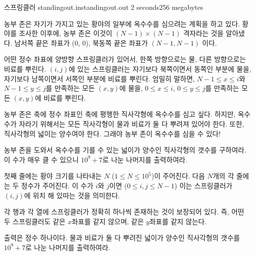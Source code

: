\begin{problem}{스프링클러}
	{standingout.in}{standingout.out}
	{2 seconds}{256 megabytes}{}
	
	농부 존은 자기가 가지고 있는 황야의 일부에 옥수수를 심으려는 계획을 하고 있다. 황야를 조사한 이후에, 농부 존은 이것이 $(N-1) \times (N-1)$ 격자라는 것을 알아냈다. 남서쪽 끝은 좌표가 (0, 0), 북동쪽 끝은 좌표가 $(N-1, N-1)$ 이다.
	
	어떤 정수 좌표에 양방향 스프링클러가 있어서, 한쪽 방향으로는 물, 다른 방향으로는 비료를 뿌린다. $(i, j)$에 있는 스프링클러는 자기보다 북쪽이면서 동쪽인 부분에 물을, 자기보다 남쪽이면서 서쪽인 부분에 비료를 뿌린다. 엄밀히 말하면, $N-1 \le x \le i$와 $N-1 \le y \le j$를 만족하는 모든 $(x, y)$에 물을, $0 \le x \le i$, $0 \le y \le j$를 만족하는 모든 $(x, y)$에 비료를 뿌린다.
	
	
	농부 존은 축에 정수 좌표인 축에 평행한 직사각형에 옥수수를 심고 싶다. 하지만, 옥수수가 자라기 위해서는 모든 직사각형이 물과 비료가 둘 다 뿌려져 있어야 한다. 또한, 직사각형의 넓이는 양수여야 한다. 그래야 농부 존이 옥수수를 심을 수 있다!
	
	농부 존을 도와서 옥수수를 기를 수 있는 넓이가 양수인 직사각형의 갯수를 구하여라. 이 수가 매우 클 수 있으니 $10^9 + 7$로 나눈 나머지를 출력하여라.
	
	
	\InputFile
	
	첫째 줄에는 황야 크기를 나타내는 $N$ ($1 \le N \le 10^5$)이 주어진다. 다음 $N$개의 각 줄에는 두 정수가 주어진다. 이 수가 $i$와 $j$이면 ($0 \le i,j \le N-1$) 이는 스프링클러가 $(i, j)$에 위치 해 있따는 것을 의미한다.
	
	각 행과 각 열에 스프링클러가 정확히 하나씩 존재하는 것이 보장되어 있다. 즉, 어떤 두 스프링클러도 같은 $x$좌표를 같지 않으며, 같은 $y$좌표를 같지 않는다.

	\OutputFile
	
	출력은 정수 하나이다. 물과 비료가 둘 다 뿌려진 넓이가 양수인 직사각형의 갯수를 $10^9+7$로 나눈 나머지를 출력하여라.
	
	\Examples
		
	\begin{example}
	\end{example}

	
	
	
\end{problem}

